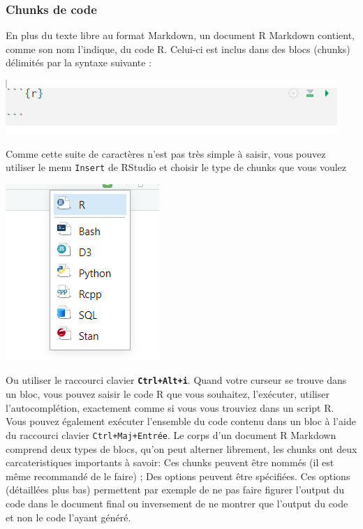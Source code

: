 \documentclass[
  12pt,
]{article}
\begin{document}
\subsubsection{Chunks de code}\label{chunks-de-code}

En plus du texte libre au format Markdown, un document R Markdown
contient, comme son nom l'indique, du code R. Celui-ci est inclus dans
des blocs (chunks) délimités par la syntaxe suivante :

\begin{center}\includegraphics[width=1\linewidth,height=1\textheight]{../Document_Rmarkdown/Images/Chunk} \end{center}

Comme cette suite de caractères n'est pas très simple à saisir, vous
pouvez utiliser le menu \texttt{Insert} de RStudio et choisir le type de
chunks que vous voulez

\begin{center}\includegraphics[width=0.3\linewidth,height=0.3\textheight]{../Document_Rmarkdown/Images/Type_chunk} \end{center}

Ou utiliser le raccourci clavier \textbf{\texttt{Ctrl+Alt+i}}. Quand
votre curseur se trouve dans un bloc, vous pouvez saisir le code R que
vous souhaitez, l'exécuter, utiliser l'autocomplétion, exactement comme
si vous vous trouviez dans un script R. Vous pouvez également exécuter
l'ensemble du code contenu dans un bloc à l'aide du raccourci clavier
\texttt{Ctrl+Maj+Entrée}. Le corps d'un document R Markdown comprend
deux types de blocs, qu'on peut alterner librement, les chunks ont deux
carcateristiques importants à savoir: Ces chunks peuvent être nommés (il
est même recommandé de le faire) ; Des options peuvent être spécifiées.
Ces options (détaillées plus bas) permettent par exemple de ne pas faire
figurer l'output du code dans le document final ou inversement de ne
montrer que l'output du code et non le code l'ayant généré.
\end{document}
